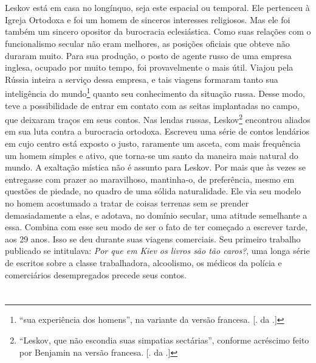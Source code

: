 \section{}

Leskov está em casa no longínquo, seja este espacial ou temporal. Ele
pertenceu à Igreja Ortodoxa e foi um homem de sinceros interesses
religiosos. Mas ele foi também um sincero opositor da burocracia
eclesiástica. Como suas relações com o funcionalismo secular não eram
melhores, as posições oficiais que obteve não duraram muito. Para sua
produção, o posto de agente russo de uma empresa inglesa, ocupado
por muito tempo, foi provavelmente o mais útil. Viajou pela Rússia
inteira a serviço dessa empresa, e tais viagens formaram tanto sua
inteligência do mundo\footnote{``sua experiência dos homens'', na
  variante da versão francesa. [. da .]} quanto seu conhecimento
da situação russa. Desse modo, teve a possibilidade de entrar em contato
com as seitas implantadas no campo, que deixaram traços em seus contos.
Nas lendas russas, Leskov\footnote{``Leskov, que não escondia suas
  simpatias sectárias'', conforme acréscimo feito por Benjamin na
  versão francesa. [. da .]} encontrou aliados em sua luta contra
a burocracia ortodoxa. Escreveu uma série de contos lendários em cujo
centro está exposto o justo, raramente um asceta, com mais frequência um
homem simples e ativo, que torna-se um santo da maneira mais natural do
mundo. A exaltação mística não é assunto para Leskov. Por mais que às
vezes se entregasse com prazer ao maravilhoso, mantinha-o, de
preferência, mesmo em questões de piedade, no quadro de uma sólida
naturalidade. Ele via seu modelo no homem acostumado a tratar de coisas
terrenas sem se prender demasiadamente a elas, e adotava, no domínio
secular, uma atitude semelhante a essa. Combina com esse seu modo de ser
o fato de ter começado a escrever tarde, aos 29 anos. Isso se deu durante
suas viagens comerciais. Seu primeiro trabalho publicado se intitulava:
\emph{Por que em Kiev os livros são tão caros?}, uma longa série de escritos
sobre a classe trabalhadora, alcoolismo, os médicos da
polícia e comerciários desempregados precede seus contos.

\section{}

